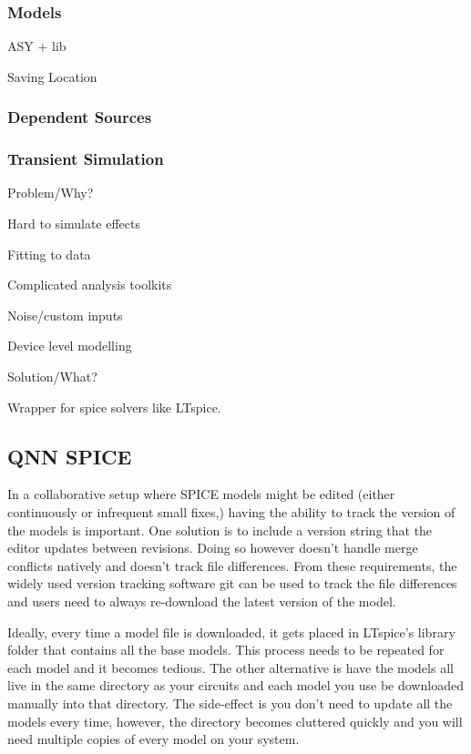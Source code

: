 \documentclass{article}
\begin{document}
\subsubsection{Models}

ASY + lib

Saving Location

\subsubsection{Dependent Sources}

\subsubsection{Transient Simulation}

Problem/Why?

Hard to simulate effects

Fitting to data

Complicated analysis toolkits

Noise/custom inputs

Device level modelling

Solution/What?

Wrapper for spice solvers like LTspice.



\subsection{QNN SPICE}

In a collaborative setup where SPICE models might be edited (either continuously or infrequent small fixes,) 
having the ability to track the version of the models is important. One solution is to include a version 
string that the editor updates between revisions. Doing so however doesn't handle merge conflicts natively and
doesn't track file differences. From these requirements, the widely used version tracking software git can be
used to track the file differences and users need to always re-download the latest version of the model.

Ideally, every time a model file is downloaded, it gets placed in LTspice's library folder that contains all the base 
models. This process needs to be repeated for each model and it becomes tedious. The other alternative is have
the models all live in the same directory as your circuits and each model you use be downloaded manually into
that directory. The side-effect is you don't need to update all the models every time, however, the directory becomes
cluttered quickly and you will need multiple copies of every model on your system.
\end{document}
